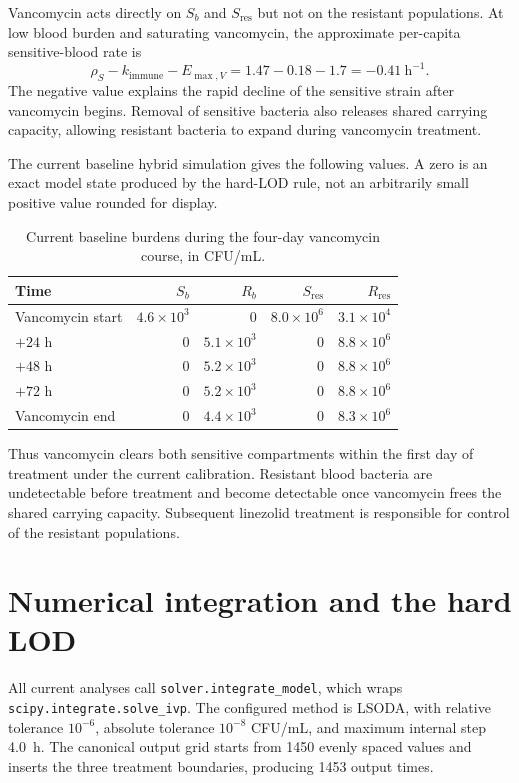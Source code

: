 \documentclass[11pt]{article}
\newcommand{\KI}{k_{\mathrm{immune}}}
\begin{document}
Vancomycin acts directly on $S_b$ and $S_{\mathrm{res}}$ but not on the
resistant populations. At low blood burden and saturating vancomycin, the
approximate per-capita sensitive-blood rate is
\begin{equation}
\rho_S-\KI-E_{\max,V}=1.47-0.18-1.7=-0.41~\mathrm{h}^{-1}.
\end{equation}
The negative value explains the rapid decline of the sensitive strain after
vancomycin begins. Removal of sensitive bacteria also releases shared carrying
capacity, allowing resistant bacteria to expand during vancomycin treatment.

The current baseline hybrid simulation gives the following values. A zero is
an exact model state produced by the hard-LOD rule, not an arbitrarily small
positive value rounded for display.

\begin{table}[htbp]
\centering
\small
\begin{tabular}{@{}lrrrr@{}}
\toprule
Time & $S_b$ & $R_b$ & $S_{\mathrm{res}}$ & $R_{\mathrm{res}}$ \\
\midrule
Vancomycin start & $4.6\times10^3$ & $0$ & $8.0\times10^6$ & $3.1\times10^4$ \\
$+24$ h & $0$ & $5.1\times10^3$ & $0$ & $8.8\times10^6$ \\
$+48$ h & $0$ & $5.2\times10^3$ & $0$ & $8.8\times10^6$ \\
$+72$ h & $0$ & $5.2\times10^3$ & $0$ & $8.8\times10^6$ \\
Vancomycin end & $0$ & $4.4\times10^3$ & $0$ & $8.3\times10^6$ \\
\bottomrule
\end{tabular}
\caption{Current baseline burdens during the four-day vancomycin course,
in CFU/mL.}
\label{tab:vancomycin-course}
\end{table}

Thus vancomycin clears both sensitive compartments within the first day of
treatment under the current calibration. Resistant blood bacteria are
undetectable before treatment and become detectable once vancomycin frees
the shared carrying capacity. Subsequent linezolid treatment is
responsible for control of the resistant populations.

\section{Numerical integration and the hard LOD}

All current analyses call \texttt{solver.integrate\_model}, which wraps
\texttt{scipy.integrate.solve\_ivp}. The configured method is LSODA, with
relative tolerance $10^{-6}$, absolute tolerance $10^{-8}$ CFU/mL, and
maximum internal step 4.0~h. The canonical output grid starts from 1450
evenly spaced values and inserts the three treatment boundaries, producing
1453 output times.
\end{document}
